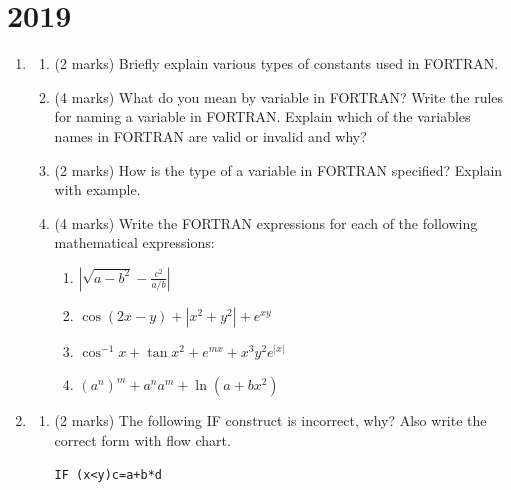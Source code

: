 \documentclass[12pt,oneside]{book}
\newcommand{\abs}[1]{\left\vert#1\right\vert}
\begin{document}
    \section{2019}
    \begin{enumerate}
        \item \begin{enumerate}
            \item (2 marks) Briefly explain various types of constants used in FORTRAN.
            \item (4 marks) What do you mean by variable in FORTRAN? Write the rules for naming a variable in FORTRAN. Explain which of the variables names in FORTRAN are valid or invalid and why?\\
            \item (2 marks) How is the type of a variable in FORTRAN specified? Explain with example.
            \item (4 marks) Write the FORTRAN expressions for each of the following mathematical expressions:\\
            \begin{enumerate}
                \item $ \abs{\sqrt{a-b^2}-\frac{c^2}{a/b}} $
                \item $ \cos(2x-y)+\abs{x^2+y^2}+e^{xy} $
                \item $ \cos^{-1} x+\tan x^2+e^{mx}+x^3y^2e^{\abs{x}}  $
                \item $ (a^n)^m+a^na^m+\ln(a+bx^2) $
            \end{enumerate}
        \end{enumerate}
        \item \begin{enumerate}
            \item (2 marks) The following IF construct is incorrect, why? Also write the correct form with flow chart.
            \begin{lstlisting}[numbers=none]
                IF (x<y)c=a+b*d

\end{lstlisting}
\end{enumerate}
\end{enumerate}
\end{document}
